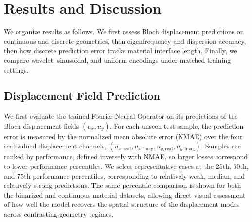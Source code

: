 \documentclass[preprint,review,12pt,numafflabel]{elsarticle}
\begin{document}


\section{Results and Discussion}


We organize results as follows. We first assess Bloch displacement predictions on continuous and discrete geometries, then eigenfrequency and dispersion accuracy, then how discrete prediction error tracks material interface length. Finally, we compare wavelet, sinusoidal, and uniform encodings under matched training settings.

\subsection{Displacement Field Prediction}
We first evaluate the trained Fourier Neural Operator on its predictions of the Bloch displacement fields $(u_x,u_y)$. For each unseen test sample, the prediction error is measured by the normalized mean absolute error (NMAE) over the four real-valued displacement channels, $(u_{x,\mathrm{real}},u_{x,\mathrm{imag}},u_{y,\mathrm{real}},u_{y,\mathrm{imag}})$. Samples are ranked by performance, defined inversely with NMAE, so larger losses correspond to lower performance percentiles. We select representative cases at the $25$th, $50$th, and $75$th performance percentiles, corresponding to relatively weak, median, and relatively strong predictions. The same percentile comparison is shown for both the binarized and continuous material datasets, allowing direct visual assessment of how well the model recovers the spatial structure of the displacement modes across contrasting geometry regimes.
\end{document}
